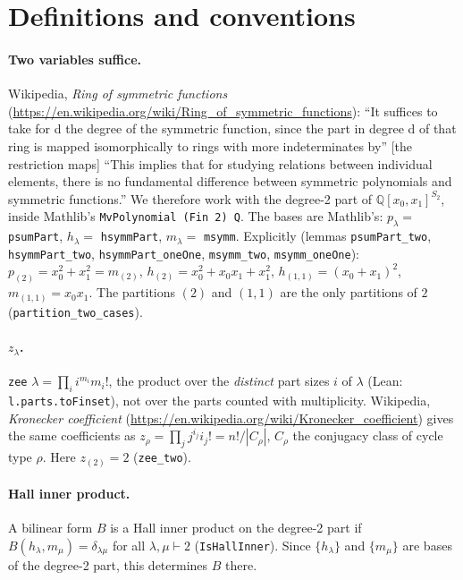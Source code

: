 \documentclass[11pt]{article}
\theoremstyle{remark}
\newcommand{\tl}{\texttt}
\begin{document}
\section{Definitions and conventions}

\paragraph{Two variables suffice.} Wikipedia, \emph{Ring of symmetric functions}
(\url{https://en.wikipedia.org/wiki/Ring_of_symmetric_functions}): ``It suffices to take for d the
degree of the symmetric function, since the part in degree d of that ring is mapped isomorphically
to rings with more indeterminates by'' [the restriction maps] ``This implies that for studying
relations between individual elements, there is no fundamental difference between symmetric
polynomials and symmetric functions.'' We therefore work with the degree-2 part of
$\mathbb{Q}[x_0,x_1]^{S_2}$, inside Mathlib's \tl{MvPolynomial (Fin 2) Q}. The bases are Mathlib's:
$p_\lambda=$ \tl{psumPart}, $h_\lambda=$ \tl{hsymmPart}, $m_\lambda=$ \tl{msymm}. Explicitly
(lemmas \tl{psumPart\_two}, \tl{hsymmPart\_two}, \tl{hsymmPart\_oneOne}, \tl{msymm\_two},
\tl{msymm\_oneOne}): $p_{(2)}=x_0^2+x_1^2=m_{(2)}$, $h_{(2)}=x_0^2+x_0x_1+x_1^2$,
$h_{(1,1)}=(x_0+x_1)^2$, $m_{(1,1)}=x_0x_1$. The partitions $(2)$ and $(1,1)$ are the only
partitions of $2$ (\tl{partition\_two\_cases}).

\paragraph{$z_\lambda$.} \tl{zee} $\lambda=\prod_{i} i^{m_i}m_i!$, the product over the \emph{distinct} part sizes $i$ of $\lambda$ (Lean: \texttt{l.parts.toFinset}), not over the parts counted with multiplicity. Wikipedia,
\emph{Kronecker coefficient} (\url{https://en.wikipedia.org/wiki/Kronecker_coefficient}) gives the
same coefficients as $z_\rho=\prod_j j^{i_j}i_j! = n!/|C_\rho|$, $C_\rho$ the conjugacy class of
cycle type $\rho$. Here $z_{(2)}=2$ (\tl{zee\_two}).

\paragraph{Hall inner product.} A bilinear form $B$ is a Hall inner product on the degree-2 part
if $B(h_\lambda,m_\mu)=\delta_{\lambda\mu}$ for all $\lambda,\mu\vdash2$
(\tl{IsHallInner}). Since $\{h_\lambda\}$ and $\{m_\mu\}$ are bases of the degree-2 part, this
determines $B$ there.
\end{document}
